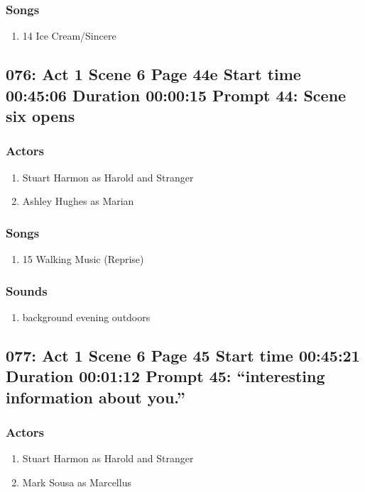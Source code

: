 \subsubsection{Songs}
\begin{enumerate}
\item 14 Ice Cream/Sincere
\end{enumerate}
\subsection{076: Act 1 Scene 6 Page 44e Start time 00:45:06 Duration 00:00:15 Prompt 44: Scene six opens}

\subsubsection{Actors}
\begin{enumerate}
\item Stuart Harmon as Harold and Stranger
\item Ashley Hughes as Marian
\end{enumerate}

\subsubsection{Songs}
\begin{enumerate}
\item 15 Walking Music (Reprise)
\end{enumerate}\subsubsection{Sounds}
\begin{enumerate}
\item background evening outdoors
\end{enumerate}
\subsection{077: Act 1 Scene 6 Page 45 Start time 00:45:21 Duration 00:01:12 Prompt 45: ``interesting information about you.''}

\subsubsection{Actors}
\begin{enumerate}
\item Stuart Harmon as Harold and Stranger
\item Mark Sousa as Marcellus
\end{enumerate}

